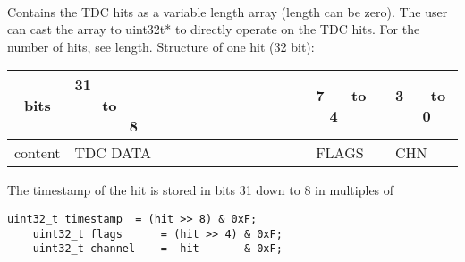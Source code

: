 	\\
	Contains the TDC hits as a variable length array (length can be zero). The user can cast the array to uint32\tu t* to directly operate on the TDC hits. For the number of hits, see length.
    Structure of one hit (32 bit):\\
	\noindent
	\begin{small}
	\begin{tabular}{|c||p{9cm}|p{}|p{}|}
		\hline
		bits & 31~ ~ ~ ~ ~ ~ ~ ~ ~ ~ ~ ~ ~ ~ ~ ~ ~ to ~ ~ ~ ~ ~ ~ ~ ~ ~ ~ ~ ~ ~ ~ ~ ~ ~ 8 & 7~ ~ to ~ ~ 4 & 3~ ~ to ~ ~ 0\\\hline
		content & TDC DATA & FLAGS & CHN \\\hline
	\end{tabular}
	\end{small}

	The timestamp of the hit is stored in bits 31 down to 8 in multiples of 
    \begin{lstlisting}[numbers = none]
    uint32_t timestamp  = (hit >> 8) & 0xF;
    uint32_t flags      = (hit >> 4) & 0xF;
    uint32_t channel    =  hit       & 0xF;
    \end{lstlisting}
	
